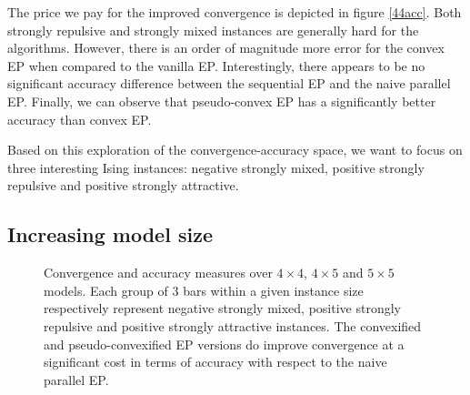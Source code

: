 \documentclass[times, 10pt,twocolumn]{article}
\begin{document}
The price we pay for the improved convergence is depicted in figure \ref{44acc}. Both strongly repulsive and strongly mixed instances are generally hard for the algorithms. However, there is an order of magnitude more error for the convex EP when compared to the vanilla EP. Interestingly, there appears to be no significant accuracy difference between the sequential EP and the naive parallel EP. Finally, we can observe that pseudo-convex EP has a significantly better accuracy than convex EP.

Based on this exploration of the convergence-accuracy space, we want to focus on three interesting Ising instances: negative strongly mixed, positive strongly repulsive and positive strongly attractive.

\subsection{Increasing model size}
\begin{figure}[ht!]\centering
	\caption{Convergence and accuracy measures over $4 \times 4$, $4 \times 5$ and $5 \times 5$ models. Each group of 3 bars within a given instance size respectively represent negative strongly mixed, positive strongly repulsive and positive strongly attractive instances. The convexified and pseudo-convexified EP versions do improve convergence at a significant cost in terms of accuracy with respect to the naive parallel EP.}
	\label{444555}
\end{figure}
\end{document}
